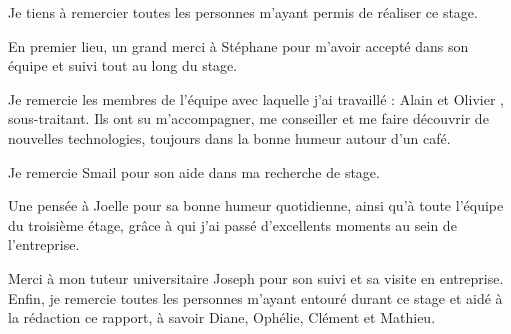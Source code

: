 Je tiens à remercier toutes les personnes m'ayant permis de réaliser ce stage.

En premier lieu, un grand merci à Stéphane  pour m'avoir accepté dans son équipe et suivi tout au long du stage.

Je remercie les membres de l'équipe avec laquelle j'ai travaillé : Alain  et Olivier , sous-traitant. Ils ont su m'accompagner, me conseiller et me faire découvrir de nouvelles technologies, toujours dans la bonne humeur autour d'un café.

Je remercie Smail  pour son aide dans ma recherche de stage. 

Une pensée à Joelle  pour sa bonne humeur quotidienne, ainsi qu'à toute l'équipe du troisième étage, grâce à qui j'ai passé d'excellents moments au sein de l'entreprise.

Merci à mon tuteur universitaire Joseph  pour son suivi et sa visite en entreprise.
Enfin, je remercie toutes les personnes m'ayant entouré durant ce stage et aidé à la rédaction ce rapport, à savoir Diane, Ophélie, Clément et Mathieu.
